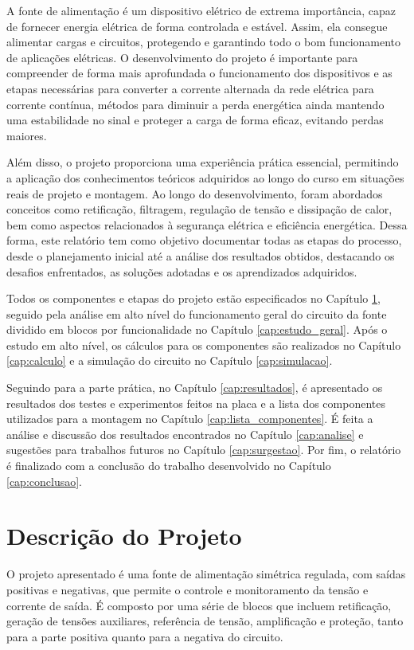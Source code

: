 \documentclass[
	12pt,				%
	oneside,			%
	a4paper,			%
	chapter=TITLE,
	sumario=tradicional,
	english,			%
	brazil				%
]{abntex2}
\begin{document}
A fonte de alimentação é um dispositivo elétrico de extrema importância, capaz de fornecer energia elétrica de forma controlada e estável. Assim, ela consegue alimentar cargas e circuitos, protegendo e garantindo todo o bom funcionamento de aplicações elétricas. O desenvolvimento do projeto é importante para compreender de forma mais aprofundada o funcionamento dos dispositivos e as etapas necessárias para converter a corrente alternada da rede elétrica para corrente contínua, métodos para diminuir a perda energética ainda mantendo uma estabilidade no sinal e proteger a carga de forma eficaz, evitando perdas maiores. 

Além disso, o projeto proporciona uma experiência prática essencial, permitindo a aplicação dos conhecimentos teóricos adquiridos ao longo do curso em situações reais de projeto e montagem. Ao longo do desenvolvimento, foram abordados conceitos como retificação, filtragem, regulação de tensão e dissipação de calor, bem como aspectos relacionados à segurança elétrica e eficiência energética. Dessa forma, este relatório tem como objetivo documentar todas as etapas do processo, desde o planejamento inicial até a análise dos resultados obtidos, destacando os desafios enfrentados, as soluções adotadas e os aprendizados adquiridos.

Todos os componentes e etapas do projeto estão especificados no Capítulo \ref{cap:objetivos}, seguido pela análise em alto nível do funcionamento geral do circuito da fonte dividido em blocos por funcionalidade no Capítulo \ref{cap:estudo_geral}. Após o estudo em alto nível, os cálculos para os componentes são realizados no Capítulo \ref{cap:calculo} e a simulação do circuito no Capítulo \ref{cap:simulacao}.

Seguindo para a parte prática, no Capítulo \ref{cap:resultados}, é apresentado os resultados dos testes e experimentos feitos na placa e a lista dos componentes utilizados para a montagem no Capítulo \ref{cap:lista_componentes}. É feita a análise e discussão dos resultados encontrados no Capítulo \ref{cap:analise} e sugestões para trabalhos futuros no Capítulo \ref{cap:surgestao}. Por fim, o relatório é finalizado com a conclusão do trabalho desenvolvido no Capítulo \ref{cap:conclusao}.


\chapter{Descrição do Projeto}\label{cap:objetivos} 

O projeto apresentado é uma fonte de alimentação simétrica regulada, com saídas positivas e negativas, que permite o controle e monitoramento da tensão e corrente de saída. É composto por uma série de blocos que incluem retificação, geração de tensões auxiliares, referência de tensão, amplificação e proteção, tanto para a parte positiva quanto para a negativa do circuito.
\end{document}
